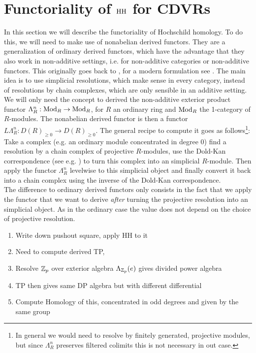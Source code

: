 \section{Functoriality of $\operatorname{HH}$ for CDVRs}
\label{HHfunctoriality}
In this section we will describe the functoriality of Hochschild homology. To do this, we will need to make use of nonabelian derived functors. They are a generalization of ordinary derived functors, which have the advantage that they also work in non-additive settings, i.e. for non-additive categories or non-additive functors. This originally goes back to \cite{DoldPuppeHomologie}, for a modern formulation see \cite[Section~5.5.8]{HigherToposTheory}.
The main idea is to use simplicial resolutions, which make sense in every category, instead of resolutions by chain complexes, which are only sensible in an additive setting. 
We will only need the concept to derived the non-additive exterior product functor $\Lambda^n_R:\operatorname{Mod}_R\to \operatorname{Mod}_R$, for $R$ an ordinary ring and $\operatorname{Mod}_R$ the 1-category of $R$-modules. The nonabelian derived functor is then a functor $L\Lambda^n_R:D(R)_{\geq 0}\to D(R)_{\geq 0}$. 
The general recipe to compute it goes as follows\footnote{In general we would need to resolve by finitely generated, projective modules, but since $\Lambda_R^n$ preserves filtered colimits this is not necessary in out case.}: Take a complex (e.g. an ordinary module concentrated in degree 0) find a resolution by a chain complex of projective $R$-modules, use the Dold-Kan correspondence (see e.g. \cite[Section~1.2.3]{lurie2017higher}) to turn this complex into an simplicial $R$-module. 
Then apply the functor $\Lambda^n_R$ levelwise to this simplicial object and finally convert it back into a chain complex using the inverse of the Dold-Kan correspondence. \\
The difference to ordinary derived functors only consists in the fact that we apply the functor that we want to derive \textit{after} turning the projective resolution into an simplicial object. 
As in the ordinary case the value does not depend on the choice of projective resolution.
\begin{enumerate}
    \item Write down pushout square, apply HH to it
    \item Need to compute derived TP, 
    \item Resolve $\mathbb{Z}_p$ over exterior algebra $\Lambda_{\mathbb{Z}_p}(e)$ gives divided power algebra
    \item TP then gives same DP algebra but with different differential
    \item Compute Homology of this, concentrated in odd degrees and given by the same group
\end{enumerate}

